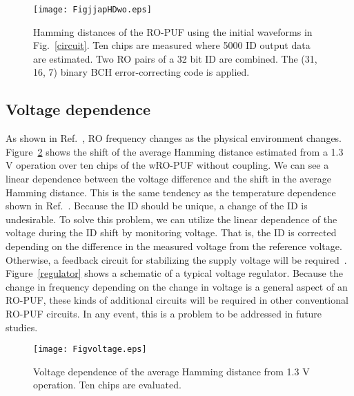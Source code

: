 \documentclass[%
reprint, amsmath,amssymb,%
pra,
]{revtex4-1}
\begin{document}
\begin{figure}
\begin{center}
\texttt{[image: FigjjapHDwo.eps]}
\end{center}
\caption{Hamming distances of the RO-PUF using the initial waveforms in Fig.~\ref{circuit}. 
 Ten chips are measured where 5000 ID output data are estimated.
Two RO pairs of a 32 bit ID are combined.
The (31, 16, 7) binary BCH error-correcting code is applied.}
\label{HDwo}
\end{figure}

\subsection{Voltage dependence}
As shown in Ref.~\cite{Sayed}, RO frequency changes as the physical environment changes.
Figure~\ref{voltage} shows the shift of the average Hamming distance estimated from a 1.3 V operation over ten chips of the wRO-PUF without coupling.
We can see a linear dependence between the voltage difference and the shift in the average Hamming distance.
This is the same tendency as the temperature dependence shown in Ref.~\cite{Sayed}.
Because the ID should be unique, a change of the ID is undesirable. 
To solve this problem, 
we can utilize the linear dependence of the voltage during the ID shift by monitoring voltage.
That is, the ID is corrected depending on the difference in the measured voltage from the reference voltage.
Otherwise, a feedback circuit for stabilizing the supply voltage will be required~\cite{Miliken}.
Figure~\ref{regulator} shows a schematic of a typical voltage regulator.
Because the change in frequency depending on the change in voltage is  
a general aspect of an RO-PUF, these kinds of additional circuits will be required 
in other conventional RO-PUF circuits.
In any event, this is a problem to be addressed in future studies.  

\begin{figure}
\begin{center}
\texttt{[image: Figvoltage.eps]}
\end{center}
\caption{Voltage dependence of the average Hamming distance from 1.3 V operation.
Ten chips are evaluated. }
\label{voltage}
\end{figure}
 
\end{document}
